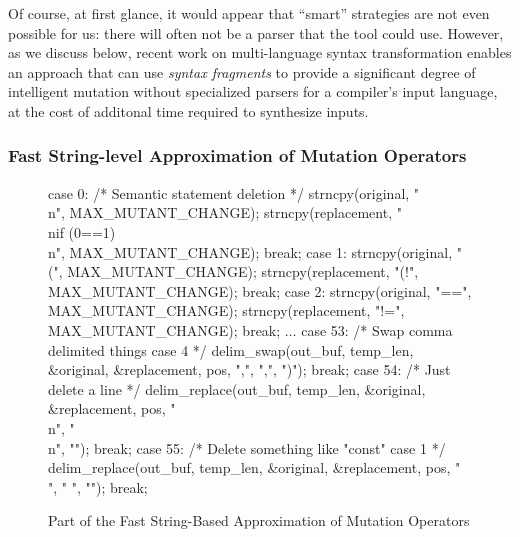 Of course, at first
glance, it would appear that  ``smart'' strategies are not even
possible for us: there will often not be a parser that the
tool could use.  However, as we discuss below, recent work on
multi-language syntax transformation enables an approach that can use
\emph{syntax fragments} to provide a significant degree of intelligent
mutation without specialized parsers for a compiler's input language,
at the cost of additonal time required to synthesize inputs.

\subsubsection{Fast String-level Approximation of Mutation Operators}
\label{strat-fast-string-level}

\begin{figure}
{\scriptsize
  \begin{code}
case 0: /* Semantic statement deletion */
    strncpy(original, "\\n", MAX\_MUTANT\_CHANGE);
    strncpy(replacement, "\\nif (0==1)\\n", MAX\_MUTANT\_CHANGE);
    break;
case 1:
    strncpy(original, "(", MAX\_MUTANT\_CHANGE);
    strncpy(replacement, "(!", MAX\_MUTANT\_CHANGE);
    break;
case 2:
    strncpy(original, "==", MAX\_MUTANT\_CHANGE);
    strncpy(replacement, "!=", MAX\_MUTANT\_CHANGE);
    break;
$\ldots$
case 53: /* Swap comma delimited things case 4 */
   delim\_swap(out\_buf, temp\_len, \&original, \&replacement, pos,
                         ",", ",", ")");
    break;
case 54: /* Just delete a line */
    delim\_replace(out\_buf, temp\_len, \&original, \&replacement,
                             pos, "\\n", "\\n", "");
    break;
case 55: /* Delete something like "const" case 1 */
    delim\_replace(out\_buf, temp\_len, \&original, \&replacement,
                             pos, " ", " ", "");
    break;    
 \end{code}
    }
 \caption{Part of the Fast String-Based Approximation of Mutation
   Operators}
     \label{fig:foperators}

\end{figure}

